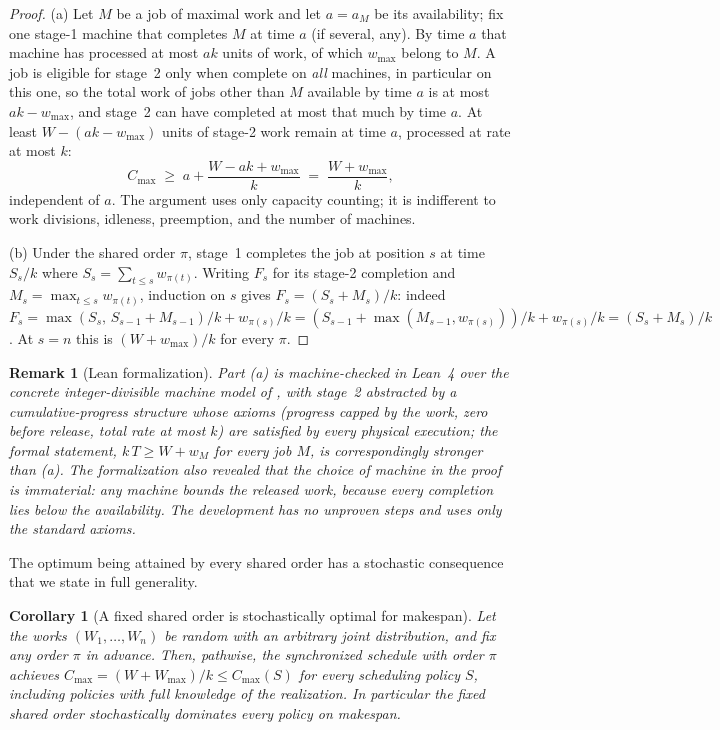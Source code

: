 \documentclass[sn-mathphys,NameDate]{sn-jnl}
\theoremstyle{thmstyleone}
\newtheorem{corollary}[theorem]{Corollary}
\theoremstyle{thmstylethree}
\theoremstyle{thmstyletwo}
\newtheorem{remark}[theorem]{Remark}
\begin{document}
\begin{proof}
(a) Let $M$ be a job of maximal work and let $a = a_M$ be its
availability; fix one stage-1 machine that completes $M$ at time
$a$ (if several, any). By time $a$ that machine has processed at
most $a k$ units of work, of which $w_{\max}$ belong to $M$. A job
is eligible for stage~2 only when complete on \emph{all} machines,
in particular on this one, so the total work of jobs other than $M$
available by time $a$ is at most $a k - w_{\max}$, and stage~2 can
have completed at most that much by time $a$. At least
$W - (a k - w_{\max})$ units of stage-2 work remain at time $a$,
processed at rate at most $k$:
\[
C_{\max} \;\ge\; a + \frac{W - a k + w_{\max}}{k}
\;=\; \frac{W + w_{\max}}{k},
\]
independent of $a$. The argument uses only capacity counting; it is
indifferent to work divisions, idleness, preemption, and the number
of machines.

(b) Under the shared order $\pi$, stage~1 completes the job at
position $s$ at time $S_s/k$ where
$S_s = \sum_{t \le s} w_{\pi(t)}$. Writing $F_s$ for its stage-2
completion and $M_s = \max_{t\le s} w_{\pi(t)}$, induction on $s$
gives $F_s = (S_s + M_s)/k$: indeed
$F_s = \max(S_s, \, S_{s-1} + M_{s-1})/k + w_{\pi(s)}/k
= (S_{s-1} + \max(M_{s-1}, w_{\pi(s)}))/k + w_{\pi(s)}/k
= (S_s + M_s)/k$. At $s = n$ this is $(W + w_{\max})/k$ for every
$\pi$.
\end{proof}

\begin{remark}[Lean formalization]\label{rem:lean}
Part (a) is machine-checked in Lean~4 over the concrete
integer-divisible machine model of \citet{bowmanA}, with stage~2
abstracted by a cumulative-progress structure whose axioms
(progress capped by the work, zero before release, total rate at
most $k$) are satisfied by every physical execution; the formal
statement, $k\,T \ge W + w_M$ for \emph{every} job $M$, is
correspondingly stronger than (a). The formalization also revealed
that the choice of machine in the proof is immaterial: any machine
bounds the released work, because every completion lies below the
availability. The development has no unproven steps and uses only
the standard axioms.
\end{remark}

The optimum being attained by every shared order has a stochastic
consequence that we state in full generality.

\begin{corollary}[A fixed shared order is stochastically optimal
for makespan]\label{cor:fixed-order}
Let the works $(W_1,\dots,W_n)$ be random with an arbitrary joint
distribution, and fix any order $\pi$ in advance. Then, pathwise,
the synchronized schedule with order $\pi$ achieves
$C_{\max} = (W + W_{\max})/k \le C_{\max}(S)$ for every scheduling
policy $S$, including policies with full knowledge of the
realization. In particular the fixed shared order stochastically
dominates every policy on makespan.
\end{corollary}
\end{document}
